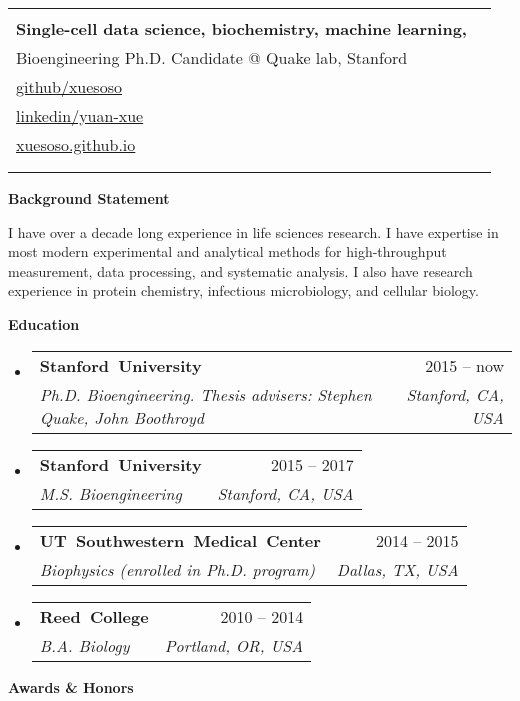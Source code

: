 \documentclass[letterpaper,12pt]{article}[leftmargin=*]
\makeatletter
\def \fullname {Yuan Xue (Soso)}
\def \subtitle {Single-cell data science, biochemistry, machine learning, \faLinux}
\def \subsubtitle {Bioengineering Ph.D. Candidate @ Quake lab, Stanford}
\def \linkedinicon {\faLinkedin}
\def \linkedinlink {https://linkedin.com/in/yuan-xue-8b1b254a/}
\def \linkedintext {linkedin/yuan-xue}
\def \emailicon {\faEnvelope}
\def \emaillink {mailto:yuanxue@stanford.edu}
\def \emailtext {yuanxue@stanford.edu}
\def \githubicon {\faGithub}
\def \githublink {https://github.com/xuesoso}
\def \githubtext {github/xuesoso}
\def \websiteicon {\faGlobe}
\def \websitelink {https://xuesoso.github.io}
\def \websitetext {xuesoso.github.io}
\def \headertype {\singlecol} %
\def \entryspacing {-0pt}
\def \linkedin {\linkedinicon \hspace{3pt}\href{\linkedinlink}{\linkedintext}}
\def \email {\emailicon \hspace{3pt}\href{\emaillink}{\emailtext}}
\def \github {\githubicon \hspace{3pt}\href{\githublink}{\githubtext}}
\def \website {\websiteicon \hspace{3pt}\href{\websitelink}{\websitetext}}
\renewcommand{\section}[2]{\vspace{5pt}
  \colorbox{secondary}{\color{white}\raggedbottom\normalsize\textbf{{#1}{\hspace{7pt}#2}}}
}
\newcommand{\resumeEntryStart}{\begin{itemize}[leftmargin=2.5mm]}
\newcommand{\resumeEntryEnd}{\end{itemize}\vspace{\entryspacing}}
\newcommand{\resumeEntryTSDL}[4]{
  \vspace{-1pt}\item[]
    \begin{tabularx}{0.97\textwidth}{X@{\hspace{40pt}}r}
      \mbox{\textbf{\color{primary}#1}} & {\firabook\color{accent}\small#2} \\
      \textit{\color{accent}\small#3} & \textit{\color{accent}\small#4} \\
    \end{tabularx}\vspace{-8pt}
}
\newcommand{\doublecol}[6]{
  \begin{tabularx}{\textwidth}{Xr}
    {
      \begin{tabular}[c]{l}
        \fontsize{35}{45}\selectfont{\color{primary}{{\textbf{\fullname}}}} \\
        {\textbf{\subtitle}} \\ {\subsubtitle} %
      \end{tabular}
    } & {
      \begin{tabular}[c]{l@{\hspace{1.5em}}l}
        {\small#4} & {\small#1} \\
        {\small#5} & {\small#2} \\
        {\small#6} & {\small#3}
      \end{tabular}
    }
  \end{tabularx}
}
\newcommand{\singlecol}[6]{
  \begin{tabularx}{\textwidth}{Xr}
    {
      \begin{tabular}[b]{l}
        \fontsize{35}{45}\selectfont{\color{primary}{{\textbf{\fullname}}}} \\
          {\textbf{\subtitle}} \\ {\subsubtitle} %
      \end{tabular}
    } & {
      \begin{tabular}[c]{l}
        {\small#1} \\
        {\small#2} \\
        {\small#3} \\
        {\small#4} \\
        {\small#5} \\
        {\small#6}
      \end{tabular}
    }
  \end{tabularx}
}
\makeatother
\begin{document}


\headertype{\email}{\github}{\linkedin}{\website}{}{} %
\vspace{-30pt} %

\section{\faImage}{Background Statement}

\begin{flushleft}
I have over a decade long experience in life sciences research. I have expertise in most modern experimental and analytical methods for high-throughput measurement, data processing, and systematic analysis. I also have research experience in protein chemistry, infectious microbiology, and cellular biology.
\end{flushleft}

\section{\faGraduationCap}{Education}

  \resumeEntryStart
    \resumeEntryTSDL
      {Stanford University}{2015 -- now}
      {Ph.D. Bioengineering. Thesis advisers: Stephen Quake, John Boothroyd}{Stanford, CA, USA}
    \resumeEntryTSDL
      {Stanford University}{2015 -- 2017}
      {M.S. Bioengineering}{Stanford, CA, USA}
    \resumeEntryTSDL
      {UT Southwestern Medical Center}{2014 -- 2015}
      {Biophysics (enrolled in Ph.D. program)}{Dallas, TX, USA}
    \resumeEntryTSDL
      {Reed College}{2010 -- 2014}
      {B.A. Biology}{Portland, OR, USA}
  \resumeEntryEnd

\section{\faTrophy}{Awards \& Honors}
\end{document}
